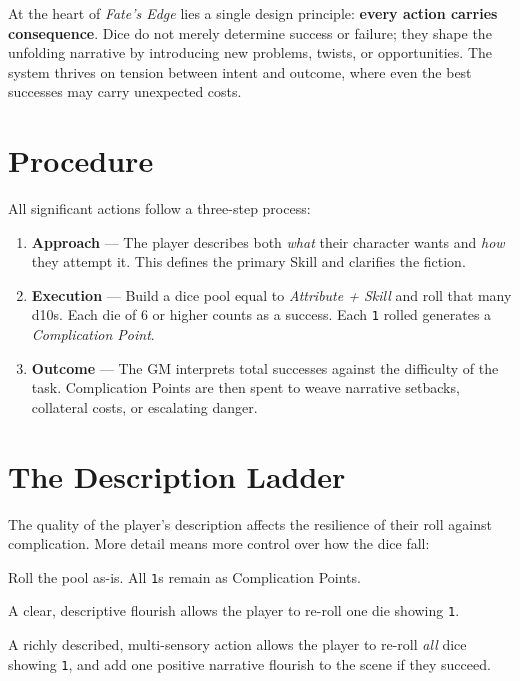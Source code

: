\documentclass[12pt]{book}
\begin{document}
At the heart of \textit{Fate’s Edge} lies a single design principle:  
\textbf{every action carries consequence}. Dice do not merely determine success or failure; they shape the unfolding narrative by introducing new problems, twists, or opportunities. The system thrives on tension between intent and outcome, where even the best successes may carry unexpected costs.

\section{Procedure}

All significant actions follow a three-step process:

\begin{enumerate}
  \item \textbf{Approach} — The player describes both \emph{what} their character wants and \emph{how} they attempt it. This defines the primary Skill and clarifies the fiction.  
  \item \textbf{Execution} — Build a dice pool equal to \emph{Attribute + Skill} and roll that many d10s. Each die of 6 or higher counts as a success. Each \texttt{1} rolled generates a \emph{Complication Point}.  
  \item \textbf{Outcome} — The GM interprets total successes against the difficulty of the task. Complication Points are then spent to weave narrative setbacks, collateral costs, or escalating danger.  
\end{enumerate}

\section{The Description Ladder}

The quality of the player’s description affects the resilience of their roll against complication.  
More detail means more control over how the dice fall:

\begin{description}[leftmargin=2cm]
  \item[Basic Action] Roll the pool as-is. All \texttt{1}s remain as Complication Points.  
  \item[Detailed Action] A clear, descriptive flourish allows the player to re-roll one die showing \texttt{1}.  
  \item[Intricate Action] A richly described, multi-sensory action allows the player to re-roll \emph{all} dice showing \texttt{1}, and add one positive narrative flourish to the scene if they succeed.  
\end{description}
\end{document}
